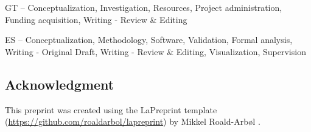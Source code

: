 GT -- Conceptualization, Investigation, Resources, Project administration, Funding acquisition, Writing - Review \& Editing

ES -- Conceptualization, Methodology, Software, Validation, Formal analysis, Writing - Original Draft, Writing - Review \& Editing, Visualization, Supervision

\subsection{Acknowledgment}
This preprint was created using the LaPreprint template (\url{https://github.com/roaldarbol/lapreprint}) by Mikkel Roald-Arb\o l \textsuperscript{}.

